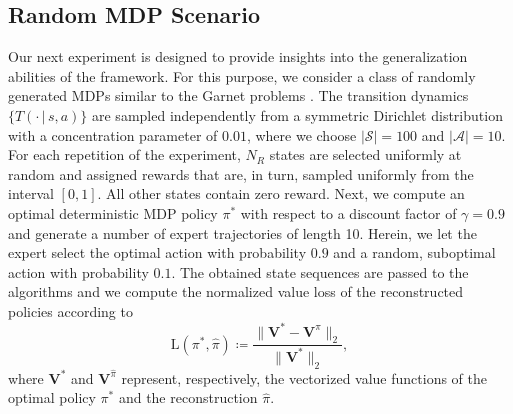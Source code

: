 \documentclass[twoside,11pt]{article}
\newcommand{\given}{\,\vert\,}
\newcommand{\defeq}{\coloneqq}
\newcommand{\eqkomma}{,}
\begin{document}
\subsection{Random MDP Scenario}
\label{sec:randomMDP}
Our next experiment is designed to provide insights into the generalization abilities of the framework. For this purpose, we consider a class of randomly generated MDPs similar to the Garnet problems \citep{bhatnagar2009natural}. The transition dynamics $\{T(\cdot \given s, a)\}$  are sampled independently from a symmetric Dirichlet distribution with a concentration parameter of $0.01$, where we choose $|\mathcal{S}|=100$ and $|\mathcal{A}|=10$. 
%
For each repetition of the experiment, $N_R$ states are selected uniformly at random and assigned rewards that are, in turn, sampled uniformly from the interval $[0,1]$. All other states %
contain zero reward. Next, we compute an optimal deterministic MDP policy $\pi^*$ with respect to a discount factor %
of $\gamma=0.9$  
%
and generate a number of expert trajectories of length 10. %
Herein, we let the expert select the optimal action with probability $0.9$ and %
a random, suboptimal action with probability $0.1$. The obtained state sequences %
are passed to the %
%
algorithms and we compute the normalized value loss of the reconstructed policies according to
%
%
%
\begin{equation}
\mathrm{L}(\pi^*, \hat{\pi}) \defeq \frac{\lVert \mathbf{V}^{*}-\mathbf{V}^{\hat{\pi}} \rVert_2}{\lVert\mathbf{V}^{*}\rVert_2} \eqkomma
\label{eq:valueLoss}
\end{equation}
where $\mathbf{V}^{*}$ and $\mathbf{V}^{\hat{\pi}}$ represent, respectively, the vectorized value functions of the optimal policy $\pi^*$ and the reconstruction $\hat{\pi}$. %
\end{document}
